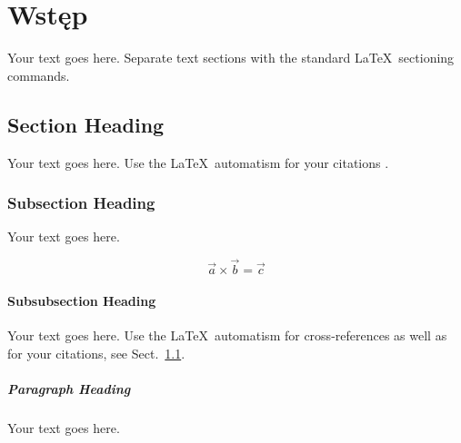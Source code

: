 
\chapter{Wstęp}
\label{Introduction} %

Your text goes here. Separate text sections with the standard \LaTeX\
sectioning commands.

\section{Section Heading}
\label{sec:1}
Your text goes here. Use the \LaTeX\ automatism for your citations
\cite{monograph}.

\subsection{Subsection Heading}
\label{sec:2}
Your text goes here.

\begin{equation}
\vec{a}\times\vec{b}=\vec{c}
\end{equation}

\subsubsection{Subsubsection Heading}
Your text goes here. Use the \LaTeX\ automatism for cross-references as
well as for your citations, see Sect.~\ref{sec:1}.

\paragraph{Paragraph Heading} %
Your text goes here.

